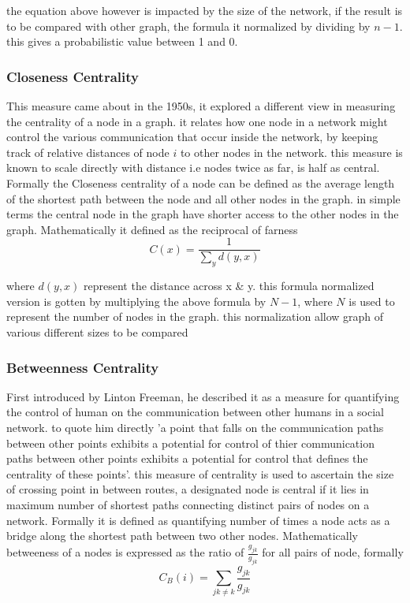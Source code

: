 the equation above however is impacted by the size of the network, if the result is to be compared with other graph, the formula it normalized by dividing by ${n-1}$. this gives a probabilistic value between 1 and 0.


\subsubsection{Closeness Centrality}
This measure came about in the 1950s, it explored a different view in measuring the centrality of a node in a graph. it relates how one node in a network might control the  various communication that occur inside the network, by keeping track of relative distances of node ${i}$ to other nodes in the network. this measure is known to scale directly with distance i.e nodes twice as far, is half as central. Formally the Closeness centrality of a node can be defined as the average length of the shortest path between the node and all other nodes in the graph. in simple terms the central node in the graph have shorter access to the other nodes in the graph.  Mathematically it defined as the reciprocal of farness\cite{bavelas1950communication}
$${C(x) = \frac{1}{\sum_{y}^{}d(y, x)} }$$

where ${d(y, x)}$ represent the distance across x \& y. this formula normalized version is gotten by multiplying the above formula by ${N-1}$,  where ${N}$ is used to represent the number of nodes in the graph. this normalization allow graph of various different sizes to be compared

\subsubsection{Betweenness Centrality}
First introduced by Linton Freeman, he described it as a measure for quantifying the control of human on the communication between other humans in a social network. to quote him directly  'a point that falls on the communication paths between other points exhibits a potential for control of thier communication paths between other points exhibits a potential for control that defines the centrality of these points'\cite{freeman1977set}. this measure of centrality is used to ascertain the size of crossing point in between routes, a designated node is central if it lies in maximum number of shortest paths connecting distinct pairs of nodes on a network. Formally it is defined as quantifying number of times a node acts as a bridge along the shortest path between two other nodes. 
Mathematically betweeness of a nodes is expressed as the ratio of  ${\frac{g_{jk}}{g_{jk}}}$ for all pairs of node, formally
$${C_B(i) = \sum_{jk \neq k}^{}  {\frac{g_{jk}}{g_{jk}}} }$$

